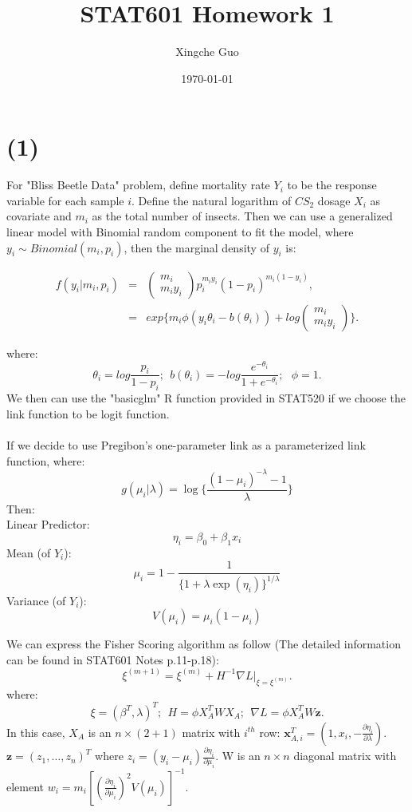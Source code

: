 \documentclass[12pt]{article}
\title{STAT601 Homework 1}
\author{Xingche Guo}
\date{\today}
\begin{document}
\maketitle

\section*{(1)}
For "Bliss Beetle Data" problem, define mortality rate $Y_i$ to be the response variable for each sample $i$. Define the natural logarithm of $CS_2$ dosage $X_i$ as covariate and $m_i$ as the total number of insects. Then we can use a generalized linear model with Binomial random component to fit the model, where $y_i \sim Binomial(m_i,p_i)$, then the marginal density of $y_i$ is:

 \begin{eqnarray*}
 f(y_i | m_i,p_i) &=&
\left(                        
\begin{matrix}
 m_i \\
m_i y_i 
\end{matrix}
\right)
p_i^{m_i y_i }(1-p_i)^{m_i (1-y_i)}, \\
&=& exp\{m_i \phi (y_i \theta_i - b(\theta_i))+log\left(                        
\begin{matrix}
 m_i \\
m_i y_i 
\end{matrix}
\right)\}.
\end{eqnarray*}

where:
$$\theta_i = log \frac{p_i}{1-p_i}; \ \ b(\theta_i)=-log \frac{e^{-\theta_i}}{1+e^{-\theta_i}}; \ \ \ \phi = 1.$$
We then can use the "basicglm" R function provided in STAT520 if we choose the link function to be logit function.\\
\\
 If we decide to use Pregibon's one-parameter link as a parameterized link function, where:
 $$g(\mu_i|\lambda)=\log\{   \frac{(1-\mu_i)^{-\lambda}-1}{\lambda}  \}$$
 Then:\\
Linear Predictor: 
$$\eta_i = \beta_0 + \beta_1 x_i$$
Mean (of $Y_i$):
$$\mu_i = 1 - \frac{1}{    \{  1 + \lambda \exp(\eta_i)  \}^{1/ \lambda}     }$$ 
Variance (of $Y_i$):
$$V(\mu_i)=\mu_i (1-\mu_i)$$


We can express the Fisher Scoring algorithm as follow (The detailed information can be found in STAT601 Notes p.11-p.18):
$$\xi^{(m+1)}=\xi^{(m)}+H^{-1}\nabla L |_{\xi = \xi^{(m)}}.$$
where:
$$\xi = (\beta^{T}, \lambda)^{T}; \ \ H=\phi X_{A}^{T}WX_{A}; \ \ \nabla L=\phi X_{A}^{T}W\pmb{z}.$$
In this case, $X_A$ is an $n \times (2+1)$ matrix with $i^{th}$ row: $\pmb{x}_{A,i}^{T}=(1,x_i,-\frac{\partial \eta_i}{\partial \lambda})$. $\pmb{z}=(z_1,\dots,z_n)^{T}$ where $z_i = (y_i-\mu_i)\frac{\partial \eta_i}{\partial \mu_i}$. W is an $n \times n$ diagonal matrix with element $w_i = m_i[(\frac{\partial \eta_i}{\partial \mu_i})^2 V(\mu_i)]^{-1}$.
\end{document}
